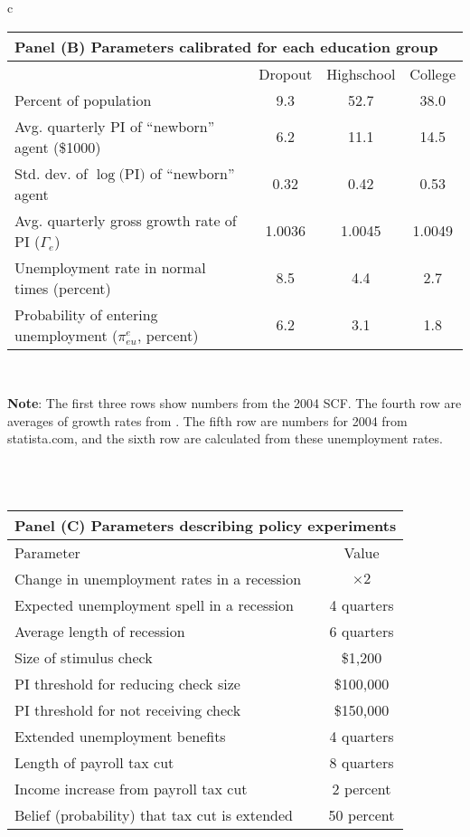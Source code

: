 \documentclass[\econtexRoot/HAFiscal]{subfiles}
\begin{document}
{\begin{table}[p]
\begin{tabular}{c}
        \begin{tabular}{lccc}
          \toprule 
          \multicolumn{4}{l}{Panel (B) Parameters calibrated for each education group} \\ \midrule
          & Dropout & Highschool & College \\ \midrule
          Percent of population & \phantom{0}9.3 & 52.7 & 38.0 \\ 
          Avg. quarterly PI of ``newborn'' agent (\$1000) & \phantom{0}6.2 & 11.1 & 14.5 \\
          Std. dev. of $\log($PI$)$ of ``newborn'' agent & 0.32 & 0.42 & 0.53 \\
          Avg. quarterly gross growth rate of PI ($\Gamma_e$) & 1.0036 & 1.0045 & 1.0049 \\
          Unemployment rate in normal times (percent) & \phantom{0}8.5 & \phantom{0}4.4 & \phantom{0}2.7 \\ 
          Probability of entering unemployment ($\pi_{eu}^{e}$, percent) & \phantom{0}6.2 & \phantom{0}3.1 & \phantom{0}1.8 
          \\ \bottomrule 
        \end{tabular} \\
        \ifdefined\HCode
        \fi
        \parbox{16cm}{\footnotesize \vspace{.25cm} \textbf{Note}: The first three rows show numbers from the 2004 SCF.
The fourth row are averages of growth rates from \cite{carroll2020modeling}.
The fifth row are numbers for 2004 from statista.com, and the sixth row are calculated from these unemployment rates.\normalsize}
        \\ \\

        \begin{tabular}{lc}
          \toprule 
          \multicolumn{2}{l}{Panel (C) Parameters describing policy experiments} \\ \midrule 
          Parameter & Value \\ \midrule 
          Change in unemployment rates in a recession & $\times 2$ \\ 
          Expected unemployment spell in a recession & 4 quarters \\ 
          Average length of recession & 6 quarters \\ 
          Size of stimulus check & \$1,200 \\ 
          PI threshold for reducing check size & \$100,000 \\ 
          PI threshold for not receiving check & \$150,000 \\ 
          Extended unemployment benefits & 4 quarters \\
          Length of payroll tax cut & 8 quarters \\ 
          Income increase from payroll tax cut & 2 percent \\ 
          Belief (probability) that tax cut is extended & 50 percent 		
          \\ \bottomrule
        \end{tabular} 


\end{tabular}
\end{table}}
\end{document}
